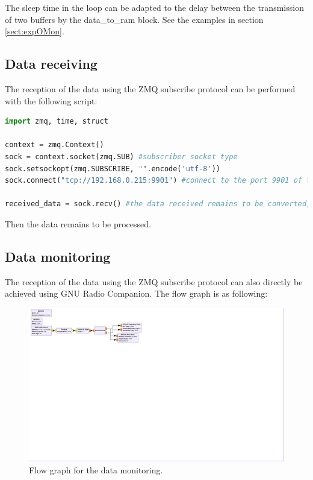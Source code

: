 \documentclass[12pt,oneside]{article}
\begin{document}
The sleep time in the loop can be adapted to the delay between the transmission of two buffers by the data\_to\_ram block. See the examples in section \ref*{sect:expOMon}. 

\subsection{Data receiving}

The reception of the data using the ZMQ subscribe protocol can be performed with the following script:

\begin{lstlisting}[language=Python]
import zmq, time, struct

context = zmq.Context()
sock = context.socket(zmq.SUB) #subscriber socket type
sock.setsockopt(zmq.SUBSCRIBE, "".encode('utf-8'))
sock.connect("tcp://192.168.0.215:9901") #connect to the port 9901 of the 192.168.0.215 machine

received_data = sock.recv() #the data received remains to be converted, deinterleaved...
\end{lstlisting}
\vspace{0.5cm}

Then the data remains to be processed.

\subsection{Data monitoring}

The reception of the data using the ZMQ subscribe protocol can also directly be achieved using GNU Radio Companion. The flow graph is as following: 
\vspace{0.5cm}
\begin{figure}[h!tb]
	\begin{center}
		\includegraphics[width=16cm,trim={0cm 32.85cm 39cm 0cm}, clip]{design/GNUflow.png}
		\caption{Flow graph for the data monitoring.}
		\label{fig:gnuradioflowgraph}
	\end{center}
\end{figure}
\vspace{0cm}
\end{document}
